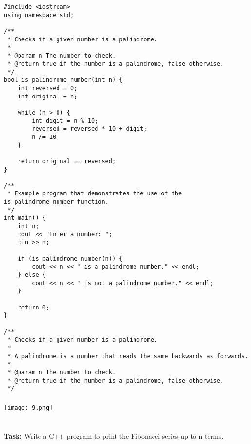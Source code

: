 \documentclass[12pt,a4paper]{article}
\begin{document}
\subsection{}
\begin{lstlisting}
#include <iostream>
using namespace std;

/**
 * Checks if a given number is a palindrome.
 *
 * @param n The number to check.
 * @return true if the number is a palindrome, false otherwise.
 */ 
bool is_palindrome_number(int n) {  
    int reversed = 0;
    int original = n;
    
    while (n > 0) {
        int digit = n % 10;
        reversed = reversed * 10 + digit;
        n /= 10;
    }
    
    return original == reversed;
}

/**
 * Example program that demonstrates the use of the is_palindrome_number function.
 */
int main() {
    int n;
    cout << "Enter a number: ";
    cin >> n;
    
    if (is_palindrome_number(n)) {
        cout << n << " is a palindrome number." << endl;
    } else {
        cout << n << " is not a palindrome number." << endl;
    }
    
    return 0;
}

/**
 * Checks if a given number is a palindrome.
 *
 * A palindrome is a number that reads the same backwards as forwards.
 *
 * @param n The number to check.
 * @return true if the number is a palindrome, false otherwise.
 */

\end{lstlisting}

\subsubsection{}
\begin{center}
    \texttt{[image: 9.png]}
\end{center}


\section{}
\textbf{Task:} Write a C++ program to print the Fibonacci series up to n terms.
\end{document}
